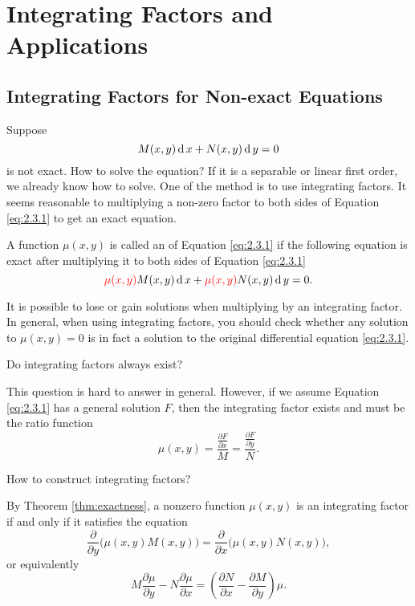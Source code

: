 \chapter{Integrating Factors and Applications}


\section{Integrating Factors for Non-exact Equations}

Suppose 
\begin{equation}
  M(x,y) \operatorname{d} x  + N(x,y)\operatorname{d} y  =0
  \label{eq:2.3.1}
\end{equation}
is not exact. How to solve the equation? If it is a separable or linear first order, we already know how to solve. One of the method is to use integrating factors.
It seems reasonable to multiplying a non-zero factor to both sides of Equation \eqref{eq:2.3.1} to get an exact equation.

\begin{definition}
  A function $\mu(x, y)$ is called an  of Equation \eqref{eq:2.3.1} if the following equation is exact after multiplying it to both sides of Equation \eqref{eq:2.3.1}
  \[{\color{red}\mu(x,y)}M(x,y) \operatorname{d} x + {\color{red}\mu(x,y)}N(x,y)\operatorname{d} y=0.\]
\end{definition}

\begin{remark}
  It is possible to lose or gain solutions when multiplying by an integrating factor. In general, when using integrating factors, you should check whether any solution
  to $\mu(x, y)=0$ is in fact a solution to the original differential equation \eqref{eq:2.3.1}.
\end{remark}

{\red Do integrating factors always exist?}

This question is hard to answer in general. However, if we assume Equation \eqref{eq:2.3.1} has a general solution $F$, then the integrating factor exists and must be the ratio function 
\[\mu(x, y)=\frac{\frac{\partial F}{\partial x}}{M}=\frac{\frac{\partial F}{\partial y}}{N}.\]

{\red How to construct integrating factors?}

By Theorem \ref{thm:exactness}, a nonzero function $\mu(x, y)$ is an integrating factor if and only if it satisfies the equation
\[\frac{\partial}{\partial y}\Big(\mu(x,y)M(x,y)\Big)=\frac{\partial}{\partial x}\Big(\mu(x,y)N(x,y)\Big),\]
or equivalently
\begin{equation}
  M\frac{\partial \mu}{\partial y} - N \frac{\partial \mu}{\partial x} =\left(\frac{\partial N}{\partial x} - \frac{\partial M}{\partial y}\right)\mu.
  \label{eq:2.3.2}
\end{equation}


